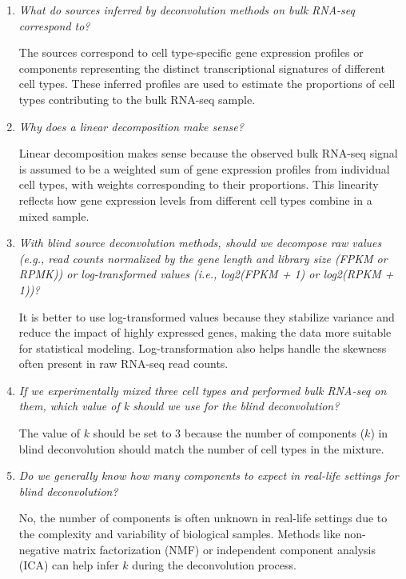 \documentclass[a4paper]{article}
\begin{document}
\begin{enumerate}

    \item \textit{What do sources inferred by deconvolution methods on bulk RNA-seq correspond to?}  
    
    The sources correspond to cell type-specific gene expression profiles or components representing the distinct transcriptional signatures of different cell types.  
    These inferred profiles are used to estimate the proportions of cell types contributing to the bulk RNA-seq sample.  

    \item \textit{Why does a linear decomposition make sense?}  
    
    Linear decomposition makes sense because the observed bulk RNA-seq signal is assumed to be a weighted sum of gene expression profiles from individual cell types, with weights corresponding to their proportions.  
    This linearity reflects how gene expression levels from different cell types combine in a mixed sample.  

    \item \textit{With blind source deconvolution methods, should we decompose raw values (e.g., read counts normalized by the gene length and library size (FPKM or RPMK)) or log-transformed values (i.e., log2(FPKM + 1) or log2(RPKM + 1))?}  
    
    It is better to use log-transformed values because they stabilize variance and reduce the impact of highly expressed genes, making the data more suitable for statistical modeling.  
    Log-transformation also helps handle the skewness often present in raw RNA-seq read counts.  

    \item \textit{If we experimentally mixed three cell types and performed bulk RNA-seq on them, which value of k should we use for the blind deconvolution?}  
    
    The value of \(k\) should be set to 3 because the number of components (\(k\)) in blind deconvolution should match the number of cell types in the mixture.  

    \item \textit{Do we generally know how many components to expect in real-life settings for blind deconvolution?}  
    
    No, the number of components is often unknown in real-life settings due to the complexity and variability of biological samples.  
    Methods like non-negative matrix factorization (NMF) or independent component analysis (ICA) can help infer \(k\) during the deconvolution process.  


\end{enumerate}
\end{document}
